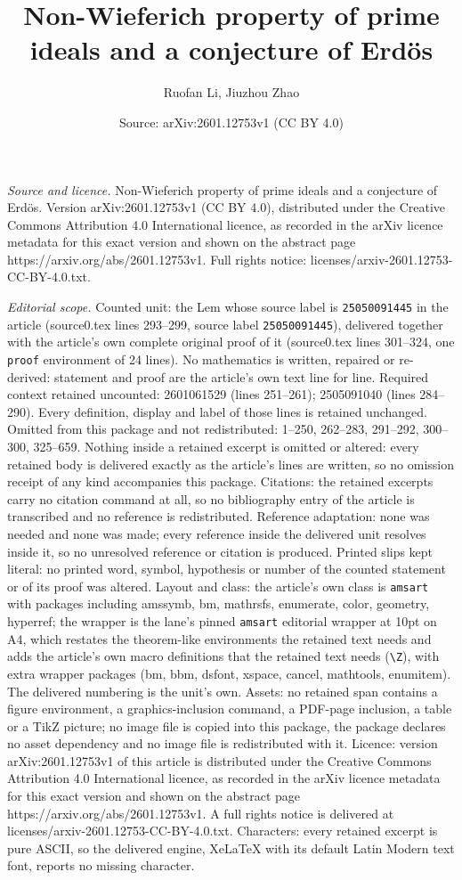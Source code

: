 \documentclass[10pt,a4paper]{amsart}
\title[Non-Wieferich property of prime ideals and a conjecture of E]{Non-Wieferich property of prime ideals and a conjecture of Erd\"os}
\author{Ruofan Li, Jiuzhou Zhao}
\date{Source: arXiv:2601.12753v1 (CC BY 4.0)}
\begin{document}
\maketitle

\noindent\emph{Source and licence.} Non-Wieferich property of prime ideals and a conjecture of Erd\"os. Version arXiv:2601.12753v1 (CC BY 4.0), distributed under the Creative Commons Attribution 4.0 International licence, as recorded in the arXiv licence metadata for this exact version and shown on the abstract page https://arxiv.org/abs/2601.12753v1. Full rights notice: licenses/arxiv-2601.12753-CC-BY-4.0.txt.\par\smallskip

\noindent\textit{Editorial scope.} Counted unit: the Lem whose source label is \texttt{25050091445} in the article (source0.tex lines 293--299, source label \texttt{25050091445}), delivered together with the article's own complete original proof of it (source0.tex lines 301--324, one \texttt{proof} environment of 24 lines). No mathematics is written, repaired or re-derived: statement and proof are the article's own text line for line. Required context retained uncounted: 2601061529 (lines 251--261); 2505091040 (lines 284--290). Every definition, display and label of those lines is retained unchanged. Omitted from this package and not redistributed: 1--250, 262--283, 291--292, 300--300, 325--659. Nothing inside a retained excerpt is omitted or altered: every retained body is delivered exactly as the article's lines are written, so no omission receipt of any kind accompanies this package. Citations: the retained excerpts carry no citation command at all, so no bibliography entry of the article is transcribed and no reference is redistributed. Reference adaptation: none was needed and none was made; every reference inside the delivered unit resolves inside it, so no unresolved reference or citation is produced. Printed slips kept literal: no printed word, symbol, hypothesis or number of the counted statement or of its proof was altered. Layout and class: the article's own class is \texttt{amsart} with packages including amssymb, bm, mathrsfs, enumerate, color, geometry, hyperref; the wrapper is the lane's pinned \texttt{amsart} editorial wrapper at 10pt on A4, which restates the theorem-like environments the retained text needs and adds the article's own macro definitions that the retained text needs (\texttt{\textbackslash Z}), with extra wrapper packages (bm, bbm, dsfont, xspace, cancel, mathtools, enumitem). The delivered numbering is the unit's own. Assets: no retained span contains a figure environment, a graphics-inclusion command, a PDF-page inclusion, a table or a TikZ picture; no image file is copied into this package, the package declares no asset dependency and no image file is redistributed with it. Licence: version arXiv:2601.12753v1 of this article is distributed under the Creative Commons Attribution 4.0 International licence, as recorded in the arXiv licence metadata for this exact version and shown on the abstract page https://arxiv.org/abs/2601.12753v1. A full rights notice is delivered at licenses/arxiv-2601.12753-CC-BY-4.0.txt. Characters: every retained excerpt is pure ASCII, so the delivered engine, XeLaTeX with its default Latin Modern text font, reports no missing character.
\end{document}
